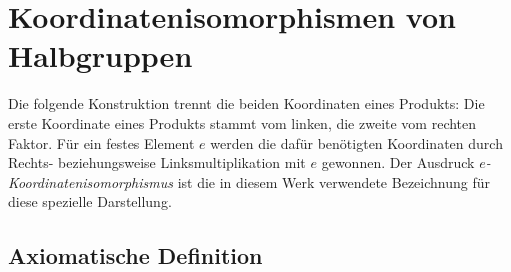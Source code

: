 \documentclass[main.tex]{subfiles}
\begin{document}
\section{Koordinatenisomorphismen von Halbgruppen}

Die folgende Konstruktion trennt die beiden Koordinaten eines Produkts:
Die erste Koordinate eines Produkts stammt vom linken, die zweite vom
rechten Faktor.  F\"ur ein festes Element \(e\) werden die daf\"ur ben\"otigten
Koordinaten durch Rechts- beziehungsweise Linksmultiplikation mit \(e\)
gewonnen.  Der Ausdruck \emph{\(e\)-Koordinatenisomorphismus} ist die in
diesem Werk verwendete Bezeichnung f\"ur diese spezielle Darstellung.

\subsection{Axiomatische Definition}


\end{document}

